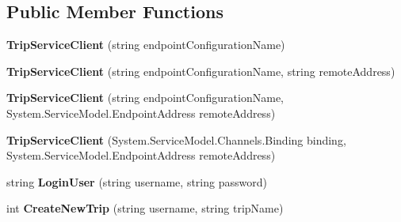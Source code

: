\subsection*{Public Member Functions}
\begin{DoxyCompactItemize}
\item 
\hypertarget{class_tripi_w_c_f_1_1_client_mockup_1_1_proxy_1_1_trip_service_client_adf574734d8750881f921ee69cf9a5631}{
{\bfseries TripServiceClient} (string endpointConfigurationName)}
\label{class_tripi_w_c_f_1_1_client_mockup_1_1_proxy_1_1_trip_service_client_adf574734d8750881f921ee69cf9a5631}

\item 
\hypertarget{class_tripi_w_c_f_1_1_client_mockup_1_1_proxy_1_1_trip_service_client_a8df5f565af8eaa4ef0a483e5ec2c0a87}{
{\bfseries TripServiceClient} (string endpointConfigurationName, string remoteAddress)}
\label{class_tripi_w_c_f_1_1_client_mockup_1_1_proxy_1_1_trip_service_client_a8df5f565af8eaa4ef0a483e5ec2c0a87}

\item 
\hypertarget{class_tripi_w_c_f_1_1_client_mockup_1_1_proxy_1_1_trip_service_client_a3d73a69c2c051af7d07455ebd01c553b}{
{\bfseries TripServiceClient} (string endpointConfigurationName, System.ServiceModel.EndpointAddress remoteAddress)}
\label{class_tripi_w_c_f_1_1_client_mockup_1_1_proxy_1_1_trip_service_client_a3d73a69c2c051af7d07455ebd01c553b}

\item 
\hypertarget{class_tripi_w_c_f_1_1_client_mockup_1_1_proxy_1_1_trip_service_client_aba38c5b511e7194f2f1f062e61dee2ba}{
{\bfseries TripServiceClient} (System.ServiceModel.Channels.Binding binding, System.ServiceModel.EndpointAddress remoteAddress)}
\label{class_tripi_w_c_f_1_1_client_mockup_1_1_proxy_1_1_trip_service_client_aba38c5b511e7194f2f1f062e61dee2ba}

\item 
\hypertarget{class_tripi_w_c_f_1_1_client_mockup_1_1_proxy_1_1_trip_service_client_afd416794b12fa01d8d233c26a9b062eb}{
string {\bfseries LoginUser} (string username, string password)}
\label{class_tripi_w_c_f_1_1_client_mockup_1_1_proxy_1_1_trip_service_client_afd416794b12fa01d8d233c26a9b062eb}

\item 
\hypertarget{class_tripi_w_c_f_1_1_client_mockup_1_1_proxy_1_1_trip_service_client_a7400abf4fb78d74521ed353b7ba0c357}{
int {\bfseries CreateNewTrip} (string username, string tripName)}
\label{class_tripi_w_c_f_1_1_client_mockup_1_1_proxy_1_1_trip_service_client_a7400abf4fb78d74521ed353b7ba0c357}


\end{DoxyCompactItemize}
